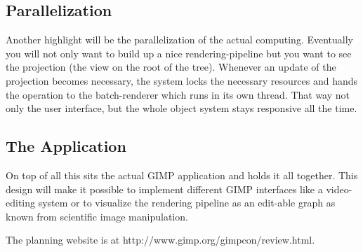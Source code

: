 \subsection{Parallelization}

Another highlight will be the parallelization of the actual computing.
Eventually you will not only want to build up a nice
rendering-pipeline but you want to see the projection (the view on the
root of the tree). Whenever an update of the projection becomes
necessary, the system locks the necessary resources and hands the
operation to the batch-renderer which runs in its own thread. That way
not only the user interface, but the whole object system stays
responsive all the time.

\subsection{The Application}
On top of all this sits the actual GIMP application and holds it all
together.  This design will make it possible to implement different
GIMP interfaces like a video-editing system or to visualize the
rendering pipeline as an edit-able graph as known from scientific
image manipulation.

The planning website is at http://www.gimp.org/gimpcon/review.html.
 
